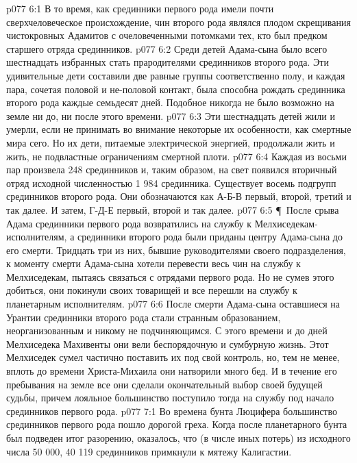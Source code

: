 \vs p077 6:1 В то время, как срединники первого рода имели почти сверхчеловеческое происхождение, чин второго рода являлся плодом скрещивания чистокровных Адамитов с очеловеченными потомками тех, кто был предком старшего отряда срединников.
\vs p077 6:2 Среди детей Адама\hyp{}сына было всего шестнадцать избранных стать прародителями срединников второго рода. Эти удивительные дети составили две равные группы соответственно полу, и каждая пара, сочетая половой и не\hyp{}половой контакт, была способна рождать срединника второго рода каждые семьдесят дней. Подобное никогда не было возможно на земле ни до, ни после этого времени.
\vs p077 6:3 Эти шестнадцать детей жили и умерли, если не принимать во внимание некоторые их особенности, как смертные мира сего. Но их дети, питаемые электрической энергией, продолжали жить и жить, не подвластные ограничениям смертной плоти.
\vs p077 6:4 Каждая из восьми пар произвела 248 срединников и, таким образом, на свет появился вторичный отряд исходной численностью 1 984 срединника. Существует восемь подгрупп срединников второго рода. Они обозначаются как А\hyp{}Б\hyp{}В первый, второй, третий и так далее. И затем, Г\hyp{}Д\hyp{}Е первый, второй и так далее.
\vs p077 6:5 \P\ После срыва Адама срединники первого рода возвратились на службу к Мелхиседекам\hyp{}исполнителям, а срединники второго рода были приданы центру Адама\hyp{}сына до его смерти. Тридцать три из них, бывшие руководителями своего подразделения, к моменту смерти Адама\hyp{}сына хотели перевести весь чин на службу к Мелхиседекам, пытаясь связаться с отрядами первого рода. Но не сумев этого добиться, они покинули своих товарищей и все перешли на службу к планетарным исполнителям.
\vs p077 6:6 После смерти Адама\hyp{}сына оставшиеся на Урантии срединники второго рода стали странным образованием, неорганизованным и никому не подчиняющимся. С этого времени и до дней Мелхиседека Махивенты они вели беспорядочную и сумбурную жизнь. Этот Мелхиседек сумел частично поставить их под свой контроль, но, тем не менее, вплоть до времени Христа\hyp{}Михаила они натворили много бед. И в течение его пребывания на земле все они сделали окончательный выбор своей будущей судьбы, причем лояльное большинство поступило тогда на службу под начало срединников первого рода.
\vs p077 7:1 Во времена бунта Люцифера большинство срединников первого рода пошло дорогой греха. Когда после планетарного бунта был подведен итог разорению, оказалось, что (в числе иных потерь) из исходного числа 50 000, 40 119 срединников примкнули к мятежу Калигастии.
